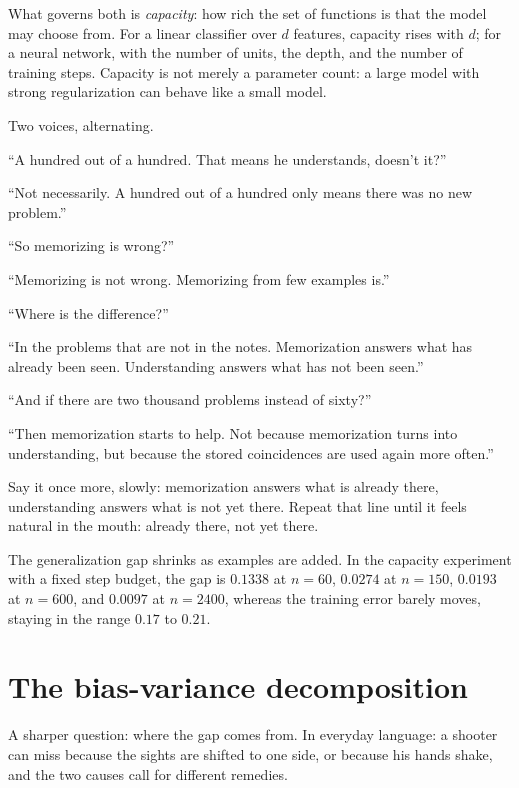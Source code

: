 What governs both is \emph{capacity}: how rich the set of functions is that the
model may choose from. For a linear classifier over $d$ features, capacity rises
with $d$; for a neural network, with the number of units, the depth, and the number
of training steps. Capacity is not merely a parameter count: a large model with
strong regularization can behave like a small model.

\begin{bacakeras}
Two voices, alternating.

``A hundred out of a hundred. That means he understands, doesn't it?''

``Not necessarily. A hundred out of a hundred only means there was no new problem.''

``So memorizing is wrong?''

``Memorizing is not wrong. Memorizing from few examples is.''

``Where is the difference?''

``In the problems that are not in the notes. Memorization answers what has already
been seen. Understanding answers what has not been seen.''

``And if there are two thousand problems instead of sixty?''

``Then memorization starts to help. Not because memorization turns into
understanding, but because the stored coincidences are used again more often.''

Say it once more, slowly: memorization answers what is already there, understanding
answers what is not yet there. Repeat that line until it feels natural in the
mouth: already there, not yet there.
\end{bacakeras}

The generalization gap shrinks as examples are added. In the capacity experiment
with a fixed step budget, the gap is $0.1338$ at $n=60$, $0.0274$ at $n=150$,
$0.0193$ at $n=600$, and $0.0097$ at $n=2400$, whereas the training error barely
moves, staying in the range $0.17$ to $0.21$.

\section{The bias-variance decomposition}

A sharper question: where the gap comes from. In everyday language: a shooter can
miss because the sights are shifted to one side, or because his hands shake, and
the two causes call for different remedies.

